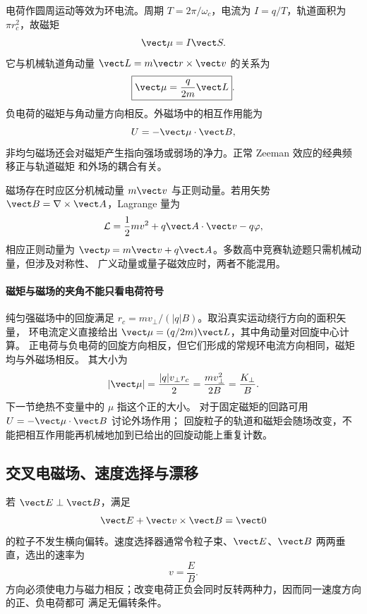 电荷作圆周运动等效为环电流。周期 $T=2\pi/\omega_c$，电流为 $I=q/T$，轨道面积为
$\pi r_c^2$，故磁矩
\begin{equation}
 \vect\mu=I\vect S.
\end{equation}
它与机械轨道角动量 $\vect L=m\vect r\times\vect v$ 的关系为
\begin{equation}
 \boxed{\vect\mu=\frac q{2m}\vect L}.
\end{equation}
负电荷的磁矩与角动量方向相反。外磁场中的相互作用能为
\begin{equation}
 U=-\vect\mu\cdot\vect B,
\end{equation}
非均匀磁场还会对磁矩产生指向强场或弱场的净力。正常 Zeeman 效应的经典频移正与轨道磁矩
和外场的耦合有关。

磁场存在时应区分机械动量 $m\vect v$ 与正则动量。若用矢势
$\vect B=\nabla\times\vect A$，Lagrange 量为
\begin{equation}
 \mathcal L=\frac12mv^2+q\vect A\cdot\vect v-q\varphi,
\end{equation}
相应正则动量为 $\vect p=m\vect v+q\vect A$。多数高中竞赛轨迹题只需机械动量，但涉及对称性、
广义动量或量子磁效应时，两者不能混用。



\paragraph{磁矩与磁场的夹角不能只看电荷符号}
纯匀强磁场中的回旋满足 $r_c=mv_\perp/(|q|B)$。取沿真实运动绕行方向的面积矢量，
环电流定义直接给出 $\vect\mu=(q/2m)\vect L$，其中角动量对回旋中心计算。
正电荷与负电荷的回旋方向相反，但它们形成的常规环电流方向相同，磁矩均与外磁场相反。
其大小为
\[
 |\vect\mu|=\frac{|q|v_\perp r_c}{2}=\frac{mv_\perp^2}{2B}=\frac{K_\perp}{B}.
\]
下一节绝热不变量中的 $\mu$ 指这个正的大小。
对于固定磁矩的回路可用 $U=-\vect\mu\cdot\vect B$ 讨论外场作用；
回旋粒子的轨道和磁矩会随场改变，不能把相互作用能再机械地加到已给出的回旋动能上重复计数。

\subsection*{交叉电磁场、速度选择与漂移}

若 $\vect E\perp\vect B$，满足
\begin{equation}
 \vect E+\vect v\times\vect B=\vect0
\end{equation}
的粒子不发生横向偏转。速度选择器通常令粒子束、$\vect E$、$\vect B$ 两两垂直，选出的速率为
\begin{equation}
 \boxed{v=\frac EB}.
\end{equation}
方向必须使电力与磁力相反；改变电荷正负会同时反转两种力，因而同一速度方向的正、负电荷都可
满足无偏转条件。

